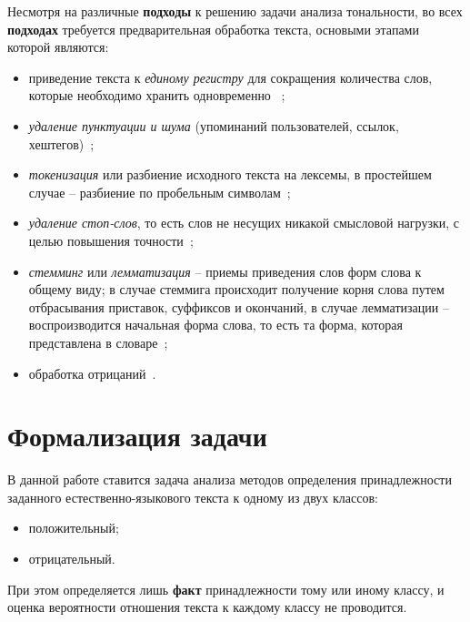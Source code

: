 Несмотря на различные \textbf{подходы} к решению задачи анализа тональности, во
всех \textbf{подходах} требуется предварительная обработка текста, основыми
этапами которой являются:
\begin{itemize}
    \item приведение текста к \textit{единому регистру} для сокращения
        количества слов, которые необходимо хранить одновременно
       ~\cite{article11};
    \item \textit{удаление пунктуации и шума} (упоминаний пользователей, ссылок,
        хештегов)~\cite{article11};
    \item \textit{токенизация} или разбиение исходного текста на лексемы, в простейшем
        случае -- разбиение по пробельным символам~\cite{article12};
    \item \textit{удаление стоп-слов}, то есть слов не несущих никакой смысловой
        нагрузки, с целью повышения точности~\cite{article11};
    \item \textit{стемминг} или \textit{лемматизация} -- приемы приведения слов
        форм слова к общему виду; в случае стеммига происходит получение корня
        слова путем отбрасывания приставок, суффиксов и окончаний, в случае
        лемматизации -- воспроизводится начальная форма слова, то есть та форма,
        которая представлена в словаре~\cite{article11};
    \item обработка отрицаний~\cite{article13}.
\end{itemize}

\section{Формализация задачи}

В данной работе ставится задача анализа методов определения принадлежности
заданного естественно-языкового текста к одному из двух классов:
\begin{itemize}
    \item положительный;
    \item отрицательный.
\end{itemize}

При этом определяется лишь \textbf{факт} принадлежности тому или иному
классу, и оценка вероятности отношения текста к каждому классу не проводится.

